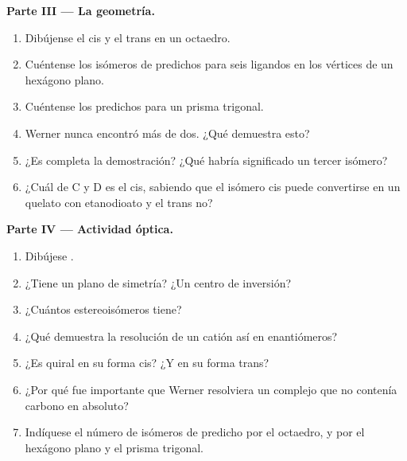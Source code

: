 \begin{problem}
\medskip
\noindent\textbf{Parte III --- La geometría.}
\begin{enumerate}[resume]
  \item Dibújense el \ce{[CoCl2(NH3)4]+} cis y el trans en un octaedro.
  \item Cuéntense los isómeros de \ce{[CoCl2(NH3)4]+} predichos para seis ligandos en los
        vértices de un hexágono plano.
  \item Cuéntense los predichos para un prisma trigonal.
  \item Werner nunca encontró más de dos. ¿Qué demuestra esto?
  \item ¿Es completa la demostración? ¿Qué habría significado un tercer isómero?
  \item ¿Cuál de C y D es el cis, sabiendo que el isómero cis puede convertirse en un
        quelato con etanodioato y el trans no?
\end{enumerate}

\medskip
\noindent\textbf{Parte IV --- Actividad óptica.}
\begin{enumerate}[resume]
  \item Dibújese .
  \item ¿Tiene un plano de simetría? ¿Un centro de inversión?
  \item ¿Cuántos estereoisómeros tiene?
  \item ¿Qué demuestra la resolución de un catión así en enantiómeros?
  \item ¿Es quiral \ce{[CoCl2(en)2]+} en su forma cis? ¿Y en su forma trans?
  \item ¿Por qué fue importante que Werner resolviera un complejo que no contenía carbono en absoluto?
  \item Indíquese el número de isómeros de \ce{[CoCl2(NH3)4]+} predicho por el octaedro,
        y por el hexágono plano y el prisma trigonal.
\end{enumerate}
\end{problem}
